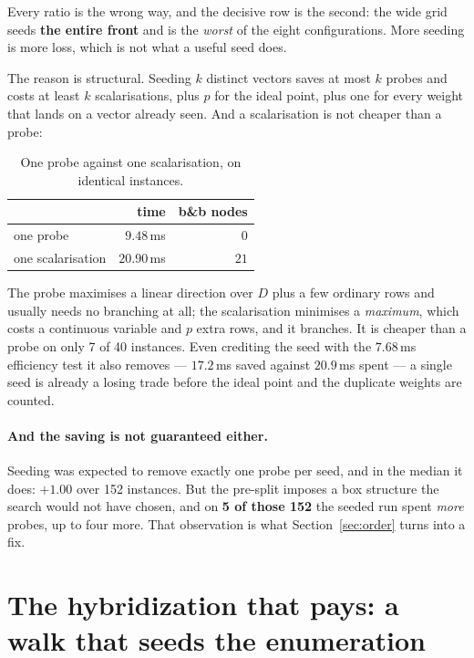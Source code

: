 \documentclass[11pt,a4paper]{article}
\newcommand{\Dset}{D}
\begin{document}
\noindent
Every ratio is the wrong way, and the decisive row is the second: the wide grid
seeds \textbf{the entire front} and is the \emph{worst} of the eight
configurations.  More seeding is more loss, which is not what a useful seed
does.

The reason is structural.  Seeding $k$ distinct vectors saves at most $k$
probes and costs at least $k$ scalarisations, plus $p$ for the ideal point,
plus one for every weight that lands on a vector already seen.  And a
scalarisation is not cheaper than a probe:

\begin{table}[h]
\centering
\caption{One probe against one scalarisation, on identical instances.}
\begin{tabular}{lrr}
\toprule
 & time & b\&b nodes \\
\midrule
one probe         & $9.48$\,ms  & $0$ \\
one scalarisation & $20.90$\,ms & $21$ \\
\bottomrule
\end{tabular}
\end{table}

\noindent
The probe maximises a linear direction over $\Dset$ plus a few ordinary rows
and usually needs no branching at all; the scalarisation minimises a
\emph{maximum}, which costs a continuous variable and $p$ extra rows, and it
branches.  It is cheaper than a probe on only 7 of 40 instances.  Even
crediting the seed with the $7.68$\,ms efficiency test it also removes ---
$17.2$\,ms saved against $20.9$\,ms spent --- a single seed is already a losing
trade before the ideal point and the duplicate weights are counted.

\paragraph{And the saving is not guaranteed either.}  Seeding was expected to
remove exactly one probe per seed, and in the median it does: $+1.00$ over 152
instances.  But the pre-split imposes a box structure the search would not have
chosen, and on \textbf{5 of those 152} the seeded run spent \emph{more} probes,
up to four more.  That observation is what Section~\ref{sec:order} turns into a
fix.

\section{The hybridization that pays: a walk that seeds the enumeration}
\label{sec:hybridfront}
\end{document}
